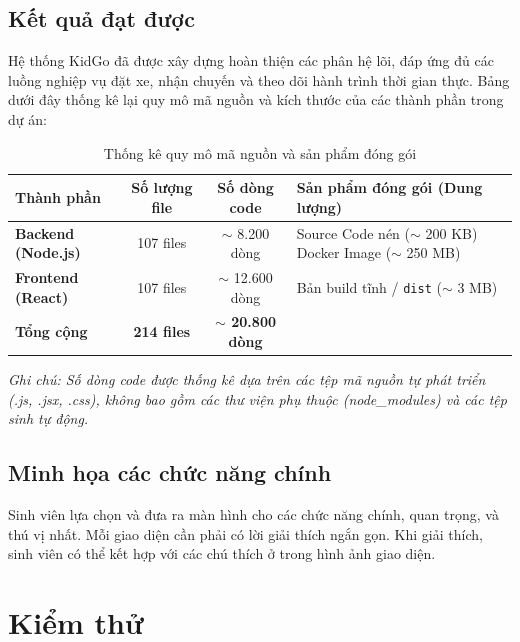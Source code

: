 \documentclass[../DoAn.tex]{subfiles}
\begin{document}
\newpage
\subsection{Kết quả đạt được}
Hệ thống KidGo đã được xây dựng hoàn thiện các phân hệ lõi, đáp ứng đủ các luồng nghiệp vụ đặt xe, nhận chuyến và theo dõi hành trình thời gian thực. Bảng dưới đây thống kê lại quy mô mã nguồn và kích thước của các thành phần trong dự án:
\begin{table}[H]
    \centering
    \caption{Thống kê quy mô mã nguồn và sản phẩm đóng gói}
    \label{table:source_stats}
    \begin{tabular}{|l|c|c|p{4cm}|}
        \hline
        \textbf{Thành phần}        & \textbf{Số lượng file} & \textbf{Số dòng code}       & \textbf{Sản phẩm đóng gói (Dung lượng)}                               \\ \hline
        \textbf{Backend (Node.js)} & 107 files              & $\sim$ 8.200 dòng           & Source Code nén ($\sim$ 200 KB) \newline Docker Image ($\sim$ 250 MB) \\ \hline
        \textbf{Frontend (React)}  & 107 files              & $\sim$ 12.600 dòng          & Bản build tĩnh / \texttt{dist} ($\sim$ 3 MB)                          \\ \hline
        \textbf{Tổng cộng}         & \textbf{214 files}     & \textbf{$\sim$ 20.800 dòng} &                                                                       \\ \hline
    \end{tabular}
\end{table}
\textit{Ghi chú: Số dòng code được thống kê dựa trên các tệp mã nguồn tự phát triển (.js, .jsx, .css), không bao gồm các thư viện phụ thuộc (node\_modules) và các tệp sinh tự động.}

\subsection{Minh họa các chức năng chính}
Sinh viên lựa chọn và đưa ra màn hình cho các chức năng chính, quan trọng, và thú vị nhất. Mỗi giao diện cần phải có lời giải thích ngắn gọn. Khi giải thích, sinh viên có thể kết hợp với các chú thích ở trong hình ảnh giao diện.

\section{Kiểm thử}
\end{document}

